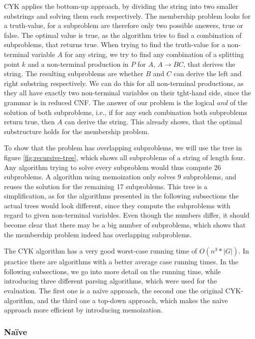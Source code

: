 CYK applies the bottom-up approach, by dividing the string into two smaller substrings and solving them each respectively.
The membership problem looks for a truth-value, for a subproblem are therefore only two possible answers, true or false.
The optimal value is true, as the algorithm tries to find a combination of subproblems, that returns true.
When trying to find the truth-value for a non-terminal variable $A$ for any string, we try to find any combination of a splitting point $k$ and a non-terminal production in $P$ for $A$, $A\rightarrow BC$, that derives the string.
The resulting subproblems are whether $B$ and $C$ can derive the left and right substring respectively.
We can do this for all non-terminal productions, as they all have exactly two non-terminal variables on their tght-hand side, since the grammar is in reduced CNF.
The answer of our problem is the logical \textit{and} of the solution of both subproblems, i.e., if for any such combination both subproblems return true, then $A$ can derive the string.
This already shows, that the optimal substructure holds for the membership problem.



To show that the problem has overlapping subproblems, we will use the tree in figure \ref{fig:recursive-tree}, which shows all subproblems of a string of length four.
Any algorithm trying to solve every subproblem would thus compute 26 subproblems.
A algorithm using memoization only solves 9 subproblems, and reuses the solution for the remaining 17 subproblems.
This tree is a simplification, as for the algorithms presented in the following subsections the actual trees would look different, since they compute the subproblems with regard to given non-terminal variables.
Even though the numbers differ, it should become clear that there may be a big number of subproblems, which shows that the membership problem indeed has overlapping subproblems.

The CYK algorithm has a very good worst-case running time of $O(n^3 * |G|)$.
In practice there are algorithms with a better average case running times.
In the following subsections, we go into more detail on the running time, while introducing three different parsing algorithms, which were used for the evaluation.
The first one is a na\"{i}ve approach, the second one the original CYK-algorithm, and the third one a top-down approach, which makes the na\"{i}ve approach more efficient by introducing memoization.

\subsubsection{Na\"{i}ve}

